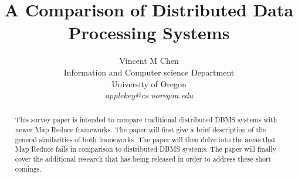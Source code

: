 \documentclass[10pt,twocolumn]{IEEEtran11}
\begin{document}


\title{\Large \bf A Comparison of Distributed Data Processing Systems}
\author{
Vincent M Chen\\
Information and Computer science Department\\
University of Oregon\\
{\em applekey@cs.uoregon.edu}
}
\maketitle

\begin{abstract}
	
	This survey paper is intended to compare traditional distributed DBMS systems with newer Map Reduce frameworks.    The paper will first give a brief description of the general similarities of both frameworks.  The paper will then delve into the areas that Map Reduce fails in comparison to distributed DBMS systems.  The paper will finally cover the additional research that has being released in order to address these short comings.
\end{abstract}
\end{document}
